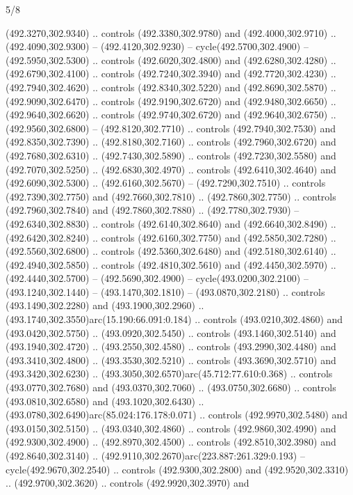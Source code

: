 \begin{flagdescription}{5/8}
\begin{scope}[xshift=0.5\flaglength,yshift=0.5\flagwidth,scale=\flagwidth/475.63]
\begin{scope}[y=0.8pt, x=0.8pt, yscale=-1, xscale=1,shift={(-450,-300)}]
\begin{scope}[cm={{1.0,0.0,0.0,1.0,(-0.0002,0.12556)}},cm={{1.0,0.0,0.0,1.0,(0.00179,0.0)}}]
\begin{scope}[cm={{1.11592,0.0,0.0,1.11592,(-106.89933,-41.77764)}}]
\begin{scope}[draw=black,fill=cfff]
\begin{scope}[fill=black]
  (492.3270,302.9340) .. controls (492.3380,302.9780) and (492.4000,302.9710) ..
  (492.4090,302.9300) -- (492.4120,302.9230) -- cycle(492.5700,302.4900) --
  (492.5950,302.5300) .. controls (492.6020,302.4800) and (492.6280,302.4280) ..
  (492.6790,302.4100) .. controls (492.7240,302.3940) and (492.7720,302.4230) ..
  (492.7940,302.4620) .. controls (492.8340,302.5220) and (492.8690,302.5870) ..
  (492.9090,302.6470) .. controls (492.9190,302.6720) and (492.9480,302.6650) ..
  (492.9640,302.6620) .. controls (492.9740,302.6720) and (492.9640,302.6750) ..
  (492.9560,302.6800) -- (492.8120,302.7710) .. controls (492.7940,302.7530) and
  (492.8350,302.7390) .. (492.8180,302.7160) .. controls (492.7960,302.6720) and
  (492.7680,302.6310) .. (492.7430,302.5890) .. controls (492.7230,302.5580) and
  (492.7070,302.5250) .. (492.6830,302.4970) .. controls (492.6410,302.4640) and
  (492.6090,302.5300) .. (492.6160,302.5670) -- (492.7290,302.7510) .. controls
  (492.7390,302.7750) and (492.7660,302.7810) .. (492.7860,302.7750) .. controls
  (492.7960,302.7840) and (492.7860,302.7880) .. (492.7780,302.7930) --
  (492.6340,302.8830) .. controls (492.6140,302.8640) and (492.6640,302.8490) ..
  (492.6420,302.8240) .. controls (492.6160,302.7750) and (492.5850,302.7280) ..
  (492.5560,302.6800) .. controls (492.5360,302.6480) and (492.5180,302.6140) ..
  (492.4940,302.5850) .. controls (492.4810,302.5610) and (492.4450,302.5970) ..
  (492.4440,302.5700) -- (492.5690,302.4900) -- cycle(493.0200,302.2100) --
  (493.1240,302.1440) -- (493.1470,302.1810) -- (493.0870,302.2180) .. controls
  (493.1490,302.2280) and (493.1900,302.2960) ..
  (493.1740,302.3550)arc(15.190:66.091:0.184) .. controls (493.0210,302.4860)
  and (493.0420,302.5750) .. (493.0920,302.5450) .. controls (493.1460,302.5140)
  and (493.1940,302.4720) .. (493.2550,302.4580) .. controls (493.2990,302.4480)
  and (493.3410,302.4800) .. (493.3530,302.5210) .. controls (493.3690,302.5710)
  and (493.3420,302.6230) .. (493.3050,302.6570)arc(45.712:77.610:0.368) ..
  controls (493.0770,302.7680) and (493.0370,302.7060) .. (493.0750,302.6680) ..
  controls (493.0810,302.6580) and (493.1020,302.6430) ..
  (493.0780,302.6490)arc(85.024:176.178:0.071) .. controls (492.9970,302.5480)
  and (493.0150,302.5150) .. (493.0340,302.4860) .. controls (492.9860,302.4990)
  and (492.9300,302.4900) .. (492.8970,302.4500) .. controls (492.8510,302.3980)
  and (492.8640,302.3140) .. (492.9110,302.2670)arc(223.887:261.329:0.193) --
  cycle(492.9670,302.2540) .. controls (492.9300,302.2800) and
  (492.9520,302.3310) .. (492.9700,302.3620) .. controls (492.9920,302.3970) and

\end{scope}
\end{scope}
\end{scope}
\end{scope}
\end{scope}
\end{scope}
\end{flagdescription}
